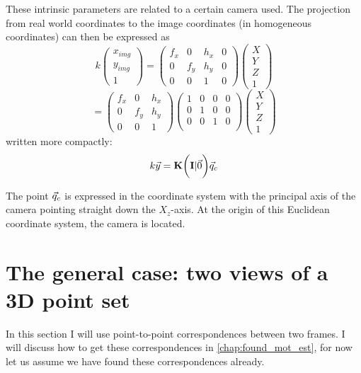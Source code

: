 These intrinsic parameters are related to a certain camera used. The projection from real world coordinates to the image coordinates (in homogeneous coordinates) can then be expressed as
\begin{equation}
    k\begin{pmatrix}
        x_{img}\\y_{img}\\1
    \end{pmatrix} = \begin{pmatrix}
        f_x & 0 & h_x & 0\\
        0 & f_y & h_y & 0\\
        0 & 0 & 1 & 0
    \end{pmatrix}\begin{pmatrix}
        X \\ Y \\ Z \\ 1
    \end{pmatrix}
\end{equation}
\begin{equation*}
    = \begin{pmatrix}
        f_x & 0 & h_x \\
        0 & f_y & h_y \\
        0 & 0 & 1
    \end{pmatrix}
    \begin{pmatrix}
        1 & 0 & 0 & 0\\
        0 & 1 & 0 & 0\\
        0 & 0 & 1 & 0\\
    \end{pmatrix}
    \begin{pmatrix}
        X \\ Y \\ Z \\ 1
    \end{pmatrix}
\end{equation*}
written more compactly:
\begin{equation}
    k\vec y = \mathbf{K} \biggl(\mathbf{I} \lvert \vec 0\biggr)\vec q_c
\end{equation}

The point $\vec q_c$ is expressed in the coordinate system with the principal axis of the camera pointing straight down the $X_z$-axis. At the origin of this Euclidean coordinate system, the camera is located.

\section{The general case: two views of a 3D point set}\label{sec:gen_case}
In this section I will use point-to-point correspondences between two frames. I will discuss how to get these correspondences in \autoref{chap:found_mot_est}, for now let us assume we have found these correspondences already.\bigskip

